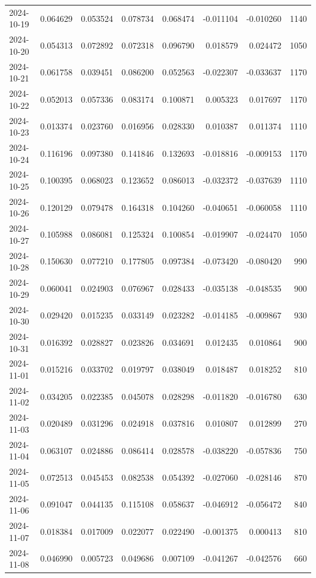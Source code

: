 \begin{tabular}{lrrrrrrr}
2024-10-19 & 0.064629 & 0.053524 & 0.078734 & 0.068474 & -0.011104 & -0.010260 & 1140 \\
2024-10-20 & 0.054313 & 0.072892 & 0.072318 & 0.096790 & 0.018579 & 0.024472 & 1050 \\
2024-10-21 & 0.061758 & 0.039451 & 0.086200 & 0.052563 & -0.022307 & -0.033637 & 1170 \\
2024-10-22 & 0.052013 & 0.057336 & 0.083174 & 0.100871 & 0.005323 & 0.017697 & 1170 \\
2024-10-23 & 0.013374 & 0.023760 & 0.016956 & 0.028330 & 0.010387 & 0.011374 & 1110 \\
2024-10-24 & 0.116196 & 0.097380 & 0.141846 & 0.132693 & -0.018816 & -0.009153 & 1170 \\
2024-10-25 & 0.100395 & 0.068023 & 0.123652 & 0.086013 & -0.032372 & -0.037639 & 1110 \\
2024-10-26 & 0.120129 & 0.079478 & 0.164318 & 0.104260 & -0.040651 & -0.060058 & 1110 \\
2024-10-27 & 0.105988 & 0.086081 & 0.125324 & 0.100854 & -0.019907 & -0.024470 & 1050 \\
2024-10-28 & 0.150630 & 0.077210 & 0.177805 & 0.097384 & -0.073420 & -0.080420 & 990 \\
2024-10-29 & 0.060041 & 0.024903 & 0.076967 & 0.028433 & -0.035138 & -0.048535 & 900 \\
2024-10-30 & 0.029420 & 0.015235 & 0.033149 & 0.023282 & -0.014185 & -0.009867 & 930 \\
2024-10-31 & 0.016392 & 0.028827 & 0.023826 & 0.034691 & 0.012435 & 0.010864 & 900 \\
2024-11-01 & 0.015216 & 0.033702 & 0.019797 & 0.038049 & 0.018487 & 0.018252 & 810 \\
2024-11-02 & 0.034205 & 0.022385 & 0.045078 & 0.028298 & -0.011820 & -0.016780 & 630 \\
2024-11-03 & 0.020489 & 0.031296 & 0.024918 & 0.037816 & 0.010807 & 0.012899 & 270 \\
2024-11-04 & 0.063107 & 0.024886 & 0.086414 & 0.028578 & -0.038220 & -0.057836 & 750 \\
2024-11-05 & 0.072513 & 0.045453 & 0.082538 & 0.054392 & -0.027060 & -0.028146 & 870 \\
2024-11-06 & 0.091047 & 0.044135 & 0.115108 & 0.058637 & -0.046912 & -0.056472 & 840 \\
2024-11-07 & 0.018384 & 0.017009 & 0.022077 & 0.022490 & -0.001375 & 0.000413 & 810 \\
2024-11-08 & 0.046990 & 0.005723 & 0.049686 & 0.007109 & -0.041267 & -0.042576 & 660 \\

\end{tabular}

